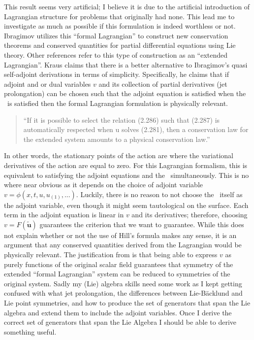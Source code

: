 \begin{description}
{This result seems very artificial; I believe it is due to the artificial introduction of Lagrangian structure
for problems that originally had none. This lead me to investigate as much as possible if this formulation is
indeed worthless or not. Ibragimov utilizes this ``formal Lagrangian'' to construct new
conservation theorems and conserved quantities for partial differential equations using Lie theory. Other
references refer to this type of construction as an ``extended Lagrangian''. Kraus claims that there is a
better alternative to Ibragimov's quasi self-adjoint derivations in terms of simplicity. Specifically, he claims that
if adjoint and or dual variables $v$ and its collection of partial derivatives (jet prolongation) can be chosen such that
the adjoint equation is satisfied when the \KSe\ is satisfied then the formal Lagrangian formulation is physically relevant.

\begin{quote}
``If it is possible to select the relation (2.286) such
that (2.287) is automatically respected when u solves (2.281), then a conservation law for
the extended system amounts to a physical conservation law.''
\end{quote}

In other words, the stationary points of the action are where the variational derivatives of the action are equal to zero.
For this Lagrangian formalism, this is equivalent to satisfying the adjoint equations and the \KSe\ simultaneously. This
is no where near obvious as it depends on the choice of adjoint variable \ie $v = \phi(x,t,u,u_{(1)}, ...)$.
Luckily, there is no reason to not choose the \KSe\ itself as the adjoint variable, even though it might seem tautological on the surface. Each term
in the adjoint equation is linear in $v$ and its derivatives; therefore, choosing $v = F(\tilde{\mathbf{u}})$ guarantees the criterion that
we want to guarantee.
While this does not explain whether or not the use of Hill's formula makes any sense, it is an argument that any conserved quantities derived
from the Lagrangian would be physically relevant. The justification from
 is that being able to express $v$ as purely functions of the original
scalar field guarantees that symmetry of the extended ``formal Lagrangian'' system can be reduced to symmetries of the original system.
Sadly my (Lie) algebra skills need some work as I kept getting confused with what jet prolongation, the differences between Lie-B\"acklund and Lie point symmetries,
and how to produce the set of generators that span the Lie algebra and extend them to include the adjoint variables.
Once I derive the correct set of generators that span the Lie Algebra I should be able to derive something useful.

}
\end{description}
